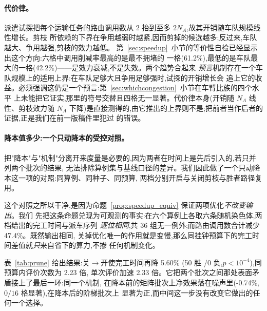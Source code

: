 \documentclass[manuscript,screen,review]{acmart}
\newcommand{\RouteCallCutLo}{42.2\%}     %
\newcommand{\RouteCallCutHi}{61.2\%}     %
\newcommand{\SpeedupProbe}{2.33}
\newcommand{\RouteCallCut}{47.4\%}
\newcommand{\GainPrune}{5.60\%}
\newcommand{\PPrune}{<10^{-4}}
\newcommand{\WinPrune}{50}
\newcommand{\LosePrune}{0}
\newcommand{\EvalRatioPrune}{2.23}
\newcommand{\GainProbePre}{-0.74\%}      %
\begin{document}
\paragraph{代价律。}
派遣试探把每个运输任务的路由调用数从 $2$ 抬到至多 $2N_A$,故其开销随车队规模线性增长。剪枝
所依赖的下界在争用越弱时越紧,因而剪掉的候选越多;反过来,车队越大、争用越强,剪枝的效力越低。
第~\ref{sec:speedup}~小节的等价性自检已经显示出这个方向:六格中调用削减率最高的是最不拥堵的
一格(\RouteCallCutHi{}),最低的是车队最大的一格(\RouteCallCutLo{})——是效力衰减,不是失效。两个趋势合起来
\emph{预言}机制存在一个车队规模上的适用上界:在车队足够大且争用足够强时,试探的开销增长会
追上它的收益。必须强调这仍是一个预言:第~\ref{sec:whichcongestion}~小节在车臂比族的四个水平
上未能把它证实,那里的符号交替且四格无一显著。代价律本身(开销随 $N_A$ 线性、剪枝效力随 $N_A$
下降)是直接测得的,由它推出的上界则不是;把前者当作后者的证据,正是我们在前一版稿件里犯过
的错误。

\paragraph{降本值多少:一个只动降本的受控对照。}
把"降本"与"机制"分离开来度量是必要的,因为两者在时间上是先后引入的,若只并列两个批次的结果,
无法排除算例集与基线口径的差异。我们因此做了一个只动降本这一项的对照:同算例、同种子、同预算,
两档分别开启与关闭剪枝与胜者路径复用。

这个对照之所以干净,是因为命题~\ref{prop:speedup_equiv} 保证两项优化\emph{不改变输出}。我们
先把这条命题兑现为可观测的事实:在六个算例上各取六条随机染色体,两档给出的完工时间与派车序列
\emph{逐位相同},共 $36$ 组无一例外;而路由调用数合计减少 \RouteCallCut{}。既然输出相同,
关掉优化唯一的作用就是变慢,那么同挂钟预算下的完工时间差值就\emph{只}来自省下的算力,不掺
任何机制变化。

表~\ref{tab:prune} 给出结果:关$\to$开使完工时间再降 \GainPrune{}
(\WinPrune{} 胜 /\LosePrune{} 负,$p\PPrune$),同预算内评价次数为 \EvalRatioPrune{} 倍,
单次评价加速 \SpeedupProbe{} 倍。它把两个批次之间那处表面矛盾接上了最后一环:同一个机制,
在降本前的矩阵批次上净效果落在噪声里(\GainProbePre{},$0/16$ 格显著),在降本后的阶梯批次上
显著为正,而中间这一步没有改变它做出的任何一个选择。

\begin{table}[t]
\caption{只改变剪枝与胜者路径复用的受控对照。"关"/"开"指剪枝与胜者路径复用是否启用,加粗
表头为本文采用的一档。两档输出逐位相同(已过等价性自检),故差值只来自省下的算力。同算例、
同种子、同挂钟预算;$n=60$ 配对,双侧 Wilcoxon 符号秩检验($^{***}p<0.001$),合计行并列
胜/负/平计数与 $p$ 值。两个比值列的分母都是\emph{关}档,但方向相反:评价次数越多越好,
单次评价耗时越少越好,故分别按 开/关 与 关/开 计。}
\label{tab:prune}
\small

\end{table}
\end{document}
